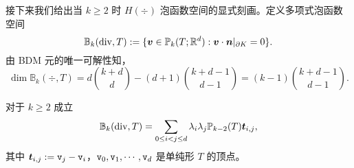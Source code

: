 接下来我们给出当 $k\geq2$ 时 $H(\div)$ 泡函数空间的显式刻画。定义多项式泡函数空间
\[
\mathbb B_k(\operatorname{div}, T):=\{\boldsymbol v\in\mathbb P_{k}(T;\mathbb R^d): \boldsymbol v\cdot\boldsymbol n|_{\partial K}=0\}.
\]
由 BDM 元的唯一可解性知，
\[
\dim \mathbb B_k(\div, T) = d\binom{k+d}{d} - (d+1)\binom{k+d-1}{d-1} = (k-1)\binom{k+d-1}{d-1}.
\]



\begin{lemma}
对于 $k\geq2$ 成立
\begin{equation}\label{eq:Hdivbubbleidentity}
\mathbb B_k(\operatorname{div}, T)=\sum_{0\leq i<j\leq d}\lambda_i\lambda_j\mathbb P_{k-2}(T)\boldsymbol t_{i,j},
\end{equation}
其中 $\boldsymbol t_{i,j}:=\textnormal{\texttt{v}}_j-\textnormal{\texttt{v}}_i$，$\textnormal{\texttt{v}}_0, \textnormal{\texttt{v}}_1, \cdots, \textnormal{\texttt{v}}_d$ 是单纯形 $T$ 的顶点。
\end{lemma}
